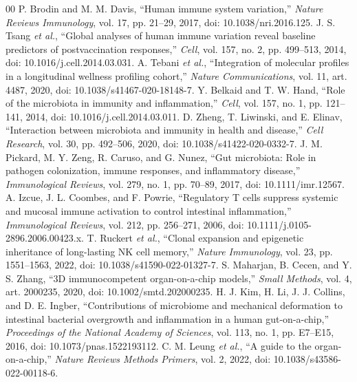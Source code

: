 \documentclass[conference]{IEEEtran}
\begin{document}
\begin{thebibliography}{00}
 P. Brodin and M. M. Davis, ``Human immune system variation,'' \emph{Nature Reviews Immunology}, vol. 17, pp. 21--29, 2017, doi: 10.1038/nri.2016.125.
 J. S. Tsang \emph{et al.}, ``Global analyses of human immune variation reveal baseline predictors of postvaccination responses,'' \emph{Cell}, vol. 157, no. 2, pp. 499--513, 2014, doi: 10.1016/j.cell.2014.03.031.
 A. Tebani \emph{et al.}, ``Integration of molecular profiles in a longitudinal wellness profiling cohort,'' \emph{Nature Communications}, vol. 11, art. 4487, 2020, doi: 10.1038/s41467-020-18148-7.
 Y. Belkaid and T. W. Hand, ``Role of the microbiota in immunity and inflammation,'' \emph{Cell}, vol. 157, no. 1, pp. 121--141, 2014, doi: 10.1016/j.cell.2014.03.011.
 D. Zheng, T. Liwinski, and E. Elinav, ``Interaction between microbiota and immunity in health and disease,'' \emph{Cell Research}, vol. 30, pp. 492--506, 2020, doi: 10.1038/s41422-020-0332-7.
 J. M. Pickard, M. Y. Zeng, R. Caruso, and G. Nunez, ``Gut microbiota: Role in pathogen colonization, immune responses, and inflammatory disease,'' \emph{Immunological Reviews}, vol. 279, no. 1, pp. 70--89, 2017, doi: 10.1111/imr.12567.
 A. Izcue, J. L. Coombes, and F. Powrie, ``Regulatory T cells suppress systemic and mucosal immune activation to control intestinal inflammation,'' \emph{Immunological Reviews}, vol. 212, pp. 256--271, 2006, doi: 10.1111/j.0105-2896.2006.00423.x.
 T. Ruckert \emph{et al.}, ``Clonal expansion and epigenetic inheritance of long-lasting NK cell memory,'' \emph{Nature Immunology}, vol. 23, pp. 1551--1563, 2022, doi: 10.1038/s41590-022-01327-7.
 S. Maharjan, B. Cecen, and Y. S. Zhang, ``3D immunocompetent organ-on-a-chip models,'' \emph{Small Methods}, vol. 4, art. 2000235, 2020, doi: 10.1002/smtd.202000235.
 H. J. Kim, H. Li, J. J. Collins, and D. E. Ingber, ``Contributions of microbiome and mechanical deformation to intestinal bacterial overgrowth and inflammation in a human gut-on-a-chip,'' \emph{Proceedings of the National Academy of Sciences}, vol. 113, no. 1, pp. E7--E15, 2016, doi: 10.1073/pnas.1522193112.
 C. M. Leung \emph{et al.}, ``A guide to the organ-on-a-chip,'' \emph{Nature Reviews Methods Primers}, vol. 2, 2022, doi: 10.1038/s43586-022-00118-6.
\end{thebibliography}
\end{document}
